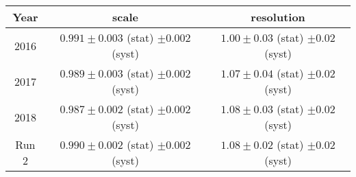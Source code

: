 \footnotesize
\begin{tabular}{|ccc|}
  \hline
  Year & scale & resolution \\
  \hline
  2016  & $0.991 \pm 0.003$ (stat) $\pm 0.002$ (syst) & $1.00 \pm 0.03$ (stat) $\pm 0.02$ (syst) \\
  2017  & $0.989 \pm 0.003$ (stat) $\pm 0.002$ (syst) & $1.07 \pm 0.04$ (stat) $\pm 0.02$ (syst) \\
  2018  & $0.987 \pm 0.002$ (stat) $\pm 0.002$ (syst) & $1.08 \pm 0.03$ (stat) $\pm 0.02$ (syst) \\
  Run 2 & $0.990 \pm 0.002$ (stat) $\pm 0.002$ (syst) & $1.08 \pm 0.02$ (stat) $\pm 0.02$ (syst) \\
  \hline
\end{tabular}
